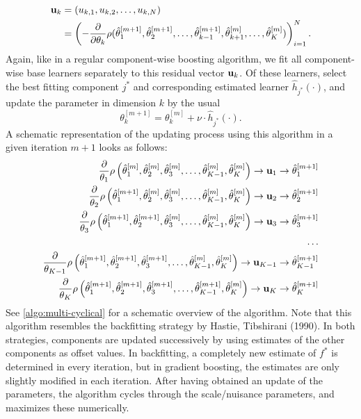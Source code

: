 \begin{align*}
\mathbf{u}_k&=(u_{k,1},u_{k,2},\ldots,u_{k,N})\\
&=\left(-\frac{\partial}{\partial \theta_k}\rho(\hat{\theta}_1^{[m+1]},\hat{\theta}_2^{[m+1]},\ldots,\hat{\theta}_{k-1}^{[m+1]},\hat{\theta}_{k+1}^{[m]},\ldots,\hat{\theta}_{K}^{[m]})\right)_{i=1}^N.
\end{align*}
Again, like in a regular component-wise boosting algorithm, we fit all component-wise base learners separately to this residual vector $\mathbf{u}_k$. Of these learners, select the best fitting component $j^*$ and corresponding estimated learner $\hat{h}_{j^*}(\cdot)$, and update the parameter in dimension $k$ by the usual
\begin{equation}
    \theta_k^{[m+1]}=\theta_k^{[m]}+\nu\cdot \hat{h}_{j^*}(\cdot).
\end{equation}
A schematic representation of the updating process using this algorithm in a given iteration $m+1$ looks as follows:
\begin{align*}
    \frac{\partial}{\theta_1}\rho\left(\hat{\theta}_1^{[m]},\hat{\theta}_2^{[m]},\hat{\theta}_3^{[m]},\ldots,\hat{\theta}_{K-1}^{[m]},\hat{\theta}_K^{[m]}\right)
    \to\mathbf{u}_{1}
    \to\hat{\theta}_{1}^{[m+1]} \\
    \frac{\partial}{\theta_2}\rho\left(\hat{\theta}_1^{[m+1]},\hat{\theta}_2^{[m]},\hat{\theta}_3^{[m]},\ldots,\hat{\theta}_{K-1}^{[m]},\hat{\theta}_K^{[m]}\right)
    \to \mathbf{u}_{2}
    \to\hat{\theta}_{2}^{[m+1]} \\
    \frac{\partial}{\theta_3}\rho\left(\hat{\theta}_1^{[m+1]},\hat{\theta}_2^{[m+1]},\hat{\theta}_3^{[m]},\ldots,\hat{\theta}_{K-1}^{[m]},\hat{\theta}_K^{[m]}\right)
    \to\mathbf{u}_{3}
    \to\hat{\theta}_{3}^{[m+1]} \\
    \ldots\\
    \frac{\partial}{\theta_{K-1}}\rho\left(\hat{\theta}_1^{[m+1]},\hat{\theta}_2^{[m+1]},\hat{\theta}_3^{[m+1]},\ldots,\hat{\theta}_{K-1}^{[m]},\hat{\theta}_K^{[m]}\right)
    \to\mathbf{u}_{K-1}
    \to\hat{\theta}_{K-1}^{[m+1]} \\
    \frac{\partial}{\theta_K}\rho\left(\hat{\theta}_1^{[m+1]},\hat{\theta}_2^{[m+1]},\hat{\theta}_3^{[m+1]},\ldots,\hat{\theta}_{K-1}^{[m+1]},\hat{\theta}_K^{[m]}\right)
    \to\mathbf{u}_{K}
    \to\hat{\theta}_{K}^{[m+1]}
\end{align*}
See \eqref{algo:multi-cyclical} for a schematic overview of the algorithm. Note that this algorithm resembles the backfitting strategy by Hastie, Tibshirani (1990). In both strategies, components are updated successively by using estimates of the other components as offset values. In backfitting, a completely new estimate of $f^*$ is determined in every iteration, but in gradient boosting, the estimates are only slightly modified in each iteration. After having obtained an update of the parameters, the algorithm cycles through the scale/nuisance parameters, and maximizes these numerically.

